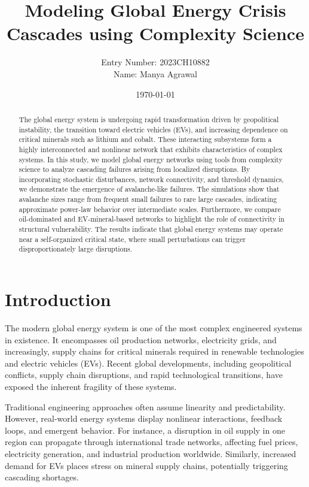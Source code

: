 \documentclass[12pt]{article}
\title{Modeling Global Energy Crisis Cascades using Complexity Science}
\author{Entry Number: 2023CH10882 \\ Name: Manya Agrawal}
\date{\today}
\begin{document}
\maketitle

\tableofcontents
\newpage

\begin{abstract}
The global energy system is undergoing rapid transformation driven by geopolitical instability, the transition toward electric vehicles (EVs), and increasing dependence on critical minerals such as lithium and cobalt. These interacting subsystems form a highly interconnected and nonlinear network that exhibits characteristics of complex systems. In this study, we model global energy networks using tools from complexity science to analyze cascading failures arising from localized disruptions. By incorporating stochastic disturbances, network connectivity, and threshold dynamics, we demonstrate the emergence of avalanche-like failures. The simulations show that avalanche sizes range from frequent small failures to rare large cascades, indicating approximate power-law behavior over intermediate scales. Furthermore, we compare oil-dominated and EV-mineral-based networks to highlight the role of connectivity in structural vulnerability. The results indicate that global energy systems may operate near a self-organized critical state, where small perturbations can trigger disproportionately large disruptions.
\end{abstract}

\section{Introduction}

The modern global energy system is one of the most complex engineered systems in existence. It encompasses oil production networks, electricity grids, and increasingly, supply chains for critical minerals required in renewable technologies and electric vehicles (EVs). Recent global developments, including geopolitical conflicts, supply chain disruptions, and rapid technological transitions, have exposed the inherent fragility of these systems.

Traditional engineering approaches often assume linearity and predictability. However, real-world energy systems display nonlinear interactions, feedback loops, and emergent behavior. For instance, a disruption in oil supply in one region can propagate through international trade networks, affecting fuel prices, electricity generation, and industrial production worldwide. Similarly, increased demand for EVs places stress on mineral supply chains, potentially triggering cascading shortages.
\end{document}
